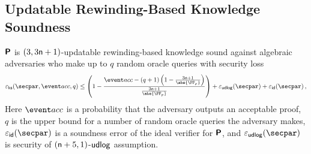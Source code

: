 \subsection{Updatable Rewinding-Based Knowledge Soundness}
\begin{lemma}
	\label{lem:plonkprot_ss}
  $\bm{\mathsf{P}}$ is $(3, 3 \mathsf{n} + 1)$-updatable rewinding-based knowledge sound against algebraic adversaries who make up to $q$ random oracle queries with security loss 
  \[
    \epscss(\secpar,\accProb, q) \leq \left(1 - \frac{\accProb - (q + 1) \left(1 - \frac{3 \noofc + 1}{\abs{\FF_p}} \right)}{\frac{3 \noofc + 1}{\abs{\FF_p}}}\right) + \epsudlog (\secpar) + \epsid (\secpar)\,,
  \]
	Here $\accProb$ is a probability that the adversary outputs an acceptable proof, $q$ is the upper bound for a number of random oracle queries the adversary makes, $\epsid(\secpar)$ is a soundness error of the ideal verifier for $\bm{\mathsf{P}}$, and $\epsudlog(\secpar)$ is security of $(\mathsf{n} + 5, 1)$-$\mathsf{udlog}$ 
	assumption.
\end{lemma}

